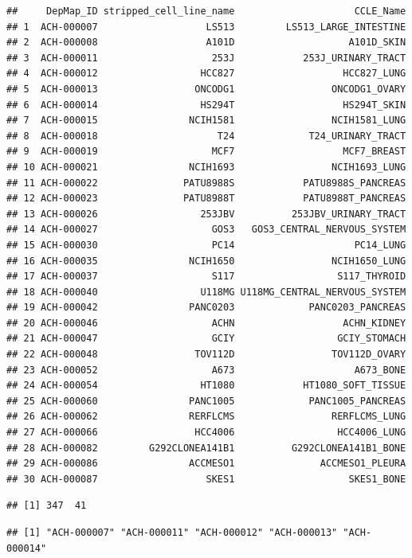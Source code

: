 \documentclass[
]{article}
\begin{document}
\begin{verbatim}
##     DepMap_ID stripped_cell_line_name                     CCLE_Name
## 1  ACH-000007                   LS513         LS513_LARGE_INTESTINE
## 2  ACH-000008                   A101D                    A101D_SKIN
## 3  ACH-000011                    253J            253J_URINARY_TRACT
## 4  ACH-000012                  HCC827                   HCC827_LUNG
## 5  ACH-000013                 ONCODG1                 ONCODG1_OVARY
## 6  ACH-000014                  HS294T                   HS294T_SKIN
## 7  ACH-000015                NCIH1581                 NCIH1581_LUNG
## 8  ACH-000018                     T24             T24_URINARY_TRACT
## 9  ACH-000019                    MCF7                   MCF7_BREAST
## 10 ACH-000021                NCIH1693                 NCIH1693_LUNG
## 11 ACH-000022               PATU8988S            PATU8988S_PANCREAS
## 12 ACH-000023               PATU8988T            PATU8988T_PANCREAS
## 13 ACH-000026                  253JBV          253JBV_URINARY_TRACT
## 14 ACH-000027                    GOS3   GOS3_CENTRAL_NERVOUS_SYSTEM
## 15 ACH-000030                    PC14                     PC14_LUNG
## 16 ACH-000035                NCIH1650                 NCIH1650_LUNG
## 17 ACH-000037                    S117                  S117_THYROID
## 18 ACH-000040                  U118MG U118MG_CENTRAL_NERVOUS_SYSTEM
## 19 ACH-000042                PANC0203             PANC0203_PANCREAS
## 20 ACH-000046                    ACHN                   ACHN_KIDNEY
## 21 ACH-000047                    GCIY                  GCIY_STOMACH
## 22 ACH-000048                 TOV112D                 TOV112D_OVARY
## 23 ACH-000052                    A673                     A673_BONE
## 24 ACH-000054                  HT1080            HT1080_SOFT_TISSUE
## 25 ACH-000060                PANC1005             PANC1005_PANCREAS
## 26 ACH-000062                RERFLCMS                 RERFLCMS_LUNG
## 27 ACH-000066                 HCC4006                  HCC4006_LUNG
## 28 ACH-000082         G292CLONEA141B1          G292CLONEA141B1_BONE
## 29 ACH-000086                ACCMESO1               ACCMESO1_PLEURA
## 30 ACH-000087                   SKES1                    SKES1_BONE
\end{verbatim}

\begin{verbatim}
## [1] 347  41
\end{verbatim}

\begin{verbatim}
## [1] "ACH-000007" "ACH-000011" "ACH-000012" "ACH-000013" "ACH-000014"
\end{verbatim}
\end{document}
